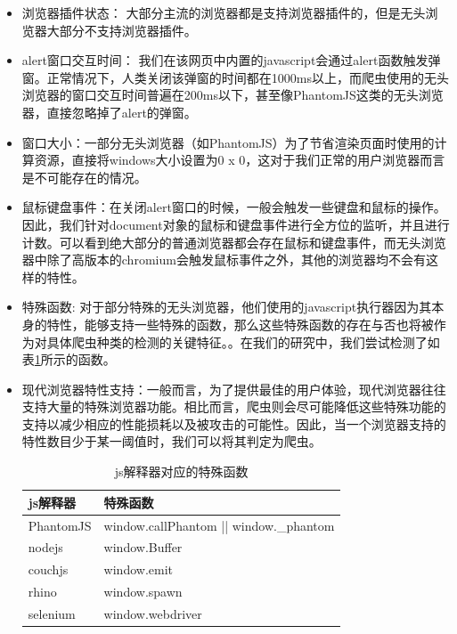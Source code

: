 \documentclass[doctor,privacy,twoside]{buaa_mac}
\begin{document}
\begin{itemize}
\item[1）] 浏览器插件状态： 大部分主流的浏览器都是支持浏览器插件的，但是无头浏览器大部分不支持浏览器插件。
\item[2）] alert窗口交互时间： 我们在该网页中内置的javascript会通过alert函数触发弹窗。正常情况下，人类关闭该弹窗的时间都在1000ms以上，而爬虫使用的无头浏览器的窗口交互时间普遍在200ms以下，甚至像PhantomJS这类的无头浏览器，直接忽略掉了alert的弹窗。
\item[3）] 窗口大小：一部分无头浏览器（如PhantomJS）为了节省渲染页面时使用的计算资源，直接将windows大小设置为0 x 0，这对于我们正常的用户浏览器而言是不可能存在的情况。
\item[4）] 鼠标键盘事件：在关闭alert窗口的时候，一般会触发一些键盘和鼠标的操作。因此，我们针对document对象的鼠标和键盘事件进行全方位的监听，并且进行计数。可以看到绝大部分的普通浏览器都会存在鼠标和键盘事件，而无头浏览器中除了高版本的chromium会触发鼠标事件之外，其他的浏览器均不会有这样的特性。
\item[5）] 特殊函数: 对于部分特殊的无头浏览器，他们使用的javascript执行器因为其本身的特性，能够支持一些特殊的函数，那么这些特殊函数的存在与否也将被作为对具体爬虫种类的检测的关键特征。。在我们的研究中，我们尝试检测了如表\ref{tab:special-function}所示的函数。
\item[6）] 现代浏览器特性支持：一般而言，为了提供最佳的用户体验，现代浏览器往往支持大量的特殊浏览器功能。相比而言，爬虫则会尽可能降低这些特殊功能的支持以减少相应的性能损耗以及被攻击的可能性。因此，当一个浏览器支持的特性数目少于某一阈值时，我们可以将其判定为爬虫。


\centerline{}
\begin{table}[h]
  \caption{js解释器对应的特殊函数}
  \label{tab:special-function}
  \centering
\begin{tabular}{|p{3cm}<{\centering}|p{8cm}<{\centering}|}
    \hline
   js解释器 &  特殊函数   \\
    \hline
PhantomJS &  window.callPhantom || window.\_{}phantom \\
\hline
nodejs & window.Buffer \\
\hline
couchjs & window.emit  \\
\hline
rhino & window.spawn \\
\hline
selenium & window.webdriver \\
\hline
    \end{tabular}
\end{table}

\end{itemize}
\end{document}
